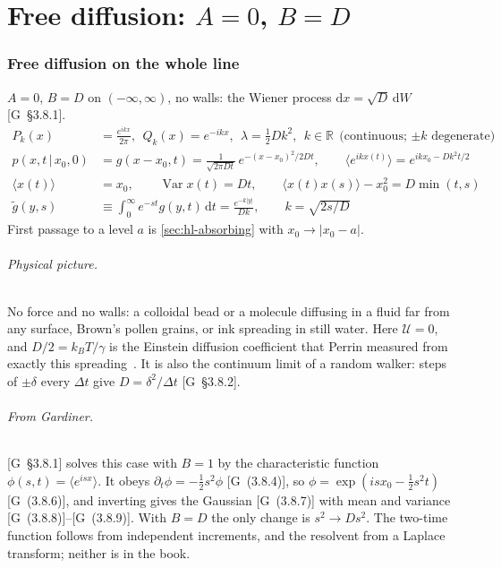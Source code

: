 \documentclass[11pt]{article}
\numberwithin{equation}{section}
\newcommand{\dd}{\mathrm{d}}
\newcommand{\avg}[1]{\langle #1\rangle}
\newcommand{\given}{\,|\,}
\newcommand{\G}[1]{[G~(#1)]}
\newcommand{\Gs}[1]{[G~\S#1]}
\begin{document}
\part{Free diffusion: \texorpdfstring{$A=0$, $B=D$}{A=0, B=D}}
\label{part:free}

\section{Free diffusion on the whole line}
\label{sec:line}

\begin{keyresults}
$A=0$, $B=D$ on $(-\infty,\infty)$, no walls: the Wiener process $\dd x=\sqrt D\,\dd W$ \Gs{3.8.1}.
\begin{align}
  P_k(x) &= \frac{e^{ikx}}{2\pi},\ \ Q_k(x)=e^{-ikx},\ \ \lambda=\tfrac12Dk^2,\ \ k\in\mathbb R
  \ \ \text{(continuous; $\pm k$ degenerate)} \\
  p(x,t\given x_0,0) &= g(x-x_0,t)=\frac{1}{\sqrt{2\pi Dt}}\,e^{-(x-x_0)^2/2Dt},\qquad
  \avg{e^{ikx(t)}}=e^{ikx_0-Dk^2t/2} \\
  \avg{x(t)} &= x_0,\qquad \operatorname{Var}x(t)=Dt,\qquad
  \avg{x(t)x(s)}-x_0^2=D\min(t,s) \\
  \tilde g(y,s) &\equiv \int_0^\infty e^{-st}g(y,t)\,\dd t=\frac{e^{-k\lvert y\rvert}}{Dk},\qquad k=\sqrt{2s/D}
  \label{eq:L-resolvent}
\end{align}
First passage to a level $a$ is \cref{sec:hl-absorbing} with $x_0\to\lvert x_0-a\rvert$.
\end{keyresults}

\paragraph{Physical picture.} No force and no walls: a colloidal bead or a molecule diffusing in a fluid far from
any surface, Brown's pollen grains, or ink spreading in still water. Here $\mathcal U=0$, and $D/2=k_BT/\gamma$ is
the Einstein diffusion coefficient that Perrin measured from exactly this spreading~\cite{perrin}. It is also the
continuum limit of a random walker: steps of $\pm\delta$ every $\Delta t$ give $D=\delta^2/\Delta t$ \Gs{3.8.2}.

\paragraph{From Gardiner.} \Gs{3.8.1} solves this case with $B=1$ by the characteristic function
$\phi(s,t)=\avg{e^{isx}}$. It obeys $\partial_t\phi=-\tfrac12s^2\phi$ \G{3.8.4}, so
$\phi=\exp(isx_0-\tfrac12s^2t)$ \G{3.8.6}, and inverting gives the Gaussian \G{3.8.7} with mean and variance
\G{3.8.8}--\G{3.8.9}. With $B=D$ the only change is $s^2\to Ds^2$. The two-time function follows from
independent increments, and the resolvent from a Laplace transform; neither is in the book.
\end{document}
